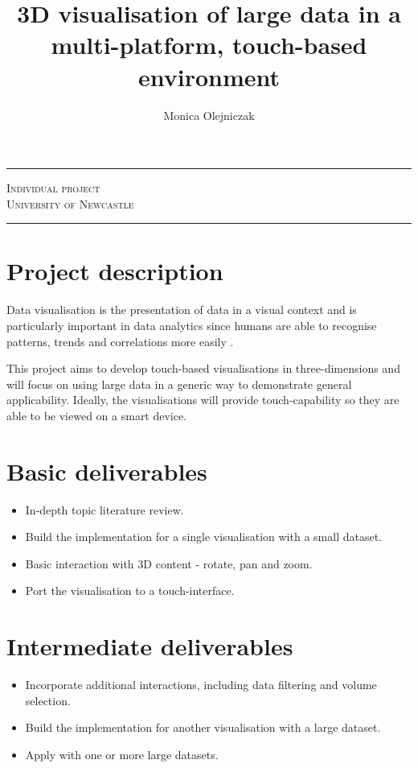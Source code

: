 \documentclass[a4paper]{article}
\title{3D visualisation of large data in a multi-platform, touch-based environment}
\author{Monica Olejniczak}
\begin{document}
	\makeatletter
	\vspace*{\fill}
	\begin{center}
		\Huge\textbf{\textsf{\@title}}
		\rule{\textwidth}{1pt}
		\LARGE\textsc{Individual project} \\
		\Large\textsc{University of Newcastle}
		\rule{\textwidth}{1pt}
		\Large\textbf{\textsf{\@author}}
	\end{center}
	\vspace*{\fill}
	\makeatother
	\newpage
	
	\section{Project description} {
	
		Data visualisation is the presentation of data in a visual context and is particularly important in data analytics since humans are able to recognise patterns, trends and correlations more easily \citep{grinstein2002introduction}.
		
		This project aims to develop touch-based visualisations in three-dimensions and will focus on using large data in a generic way to demonstrate general applicability. Ideally, the visualisations will provide touch-capability so they are able to be viewed on a smart device.
	
	}
	
	\section{Basic deliverables} {

		\begin{itemize}
			\item In-depth topic literature review.
			\item Build the implementation for a single visualisation with a small dataset.
			\item Basic interaction with 3D content - rotate, pan and zoom.
			\item Port the visualisation to a touch-interface.
		\end{itemize}
	
	}
	
	\section{Intermediate deliverables} {
	
		\begin{itemize}
			\item Incorporate additional interactions, including data filtering and volume selection.
			\item Build the implementation for another visualisation with a large dataset.
			\item Apply with one or more large datasets.
		\end{itemize}	
	
	}
	
\end{document}
